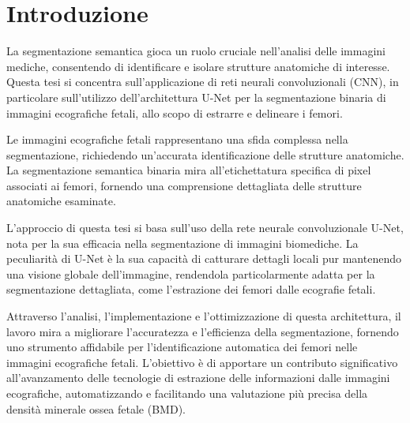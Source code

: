 \chapter{Introduzione}
\label{chap:Introduzione}


La segmentazione semantica gioca un ruolo cruciale nell'analisi delle immagini
mediche, consentendo di identificare e isolare strutture anatomiche di
interesse. Questa tesi si concentra sull'applicazione di reti neurali
convoluzionali (CNN), in particolare sull'utilizzo dell'architettura U-Net per
la segmentazione binaria di immagini ecografiche fetali, allo scopo di estrarre
e delineare i femori.


Le immagini ecografiche fetali rappresentano una sfida complessa nella
segmentazione, richiedendo un'accurata identificazione delle strutture
anatomiche. La segmentazione semantica binaria mira all'etichettatura
specifica di pixel associati ai femori, fornendo una comprensione dettagliata
delle strutture anatomiche esaminate.

L'approccio di questa tesi si basa sull'uso della rete neurale convoluzionale
U-Net, nota per la sua efficacia nella segmentazione di immagini biomediche. La
peculiarità di U-Net è la sua capacità di catturare dettagli locali pur
mantenendo una visione globale dell'immagine, rendendola particolarmente adatta
per la segmentazione dettagliata, come l'estrazione dei femori dalle ecografie
fetali.

Attraverso l'analisi, l'implementazione e l'ottimizzazione di questa
architettura, il lavoro mira a migliorare l'accuratezza e l'efficienza della
segmentazione, fornendo uno strumento affidabile per l'identificazione
automatica dei femori nelle immagini ecografiche fetali. L'obiettivo è di
apportare un contributo significativo all'avanzamento delle tecnologie di
estrazione delle informazioni dalle immagini ecografiche, automatizzando e
facilitando una valutazione più precisa della densità minerale ossea fetale
(BMD).

